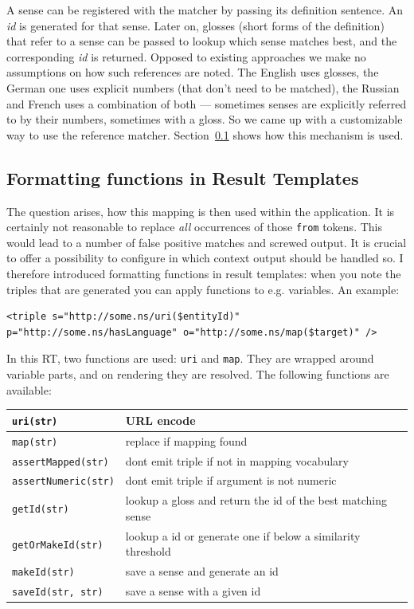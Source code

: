 A sense can be registered with the matcher by passing its definition sentence. 
An \textit{id} is generated for that sense. 
Later on, glosses (short forms of the definition) that refer to a sense can be passed to lookup which sense matches best, and the corresponding \textit{id} is returned. 
Opposed to existing approaches we make no assumptions on how such references are noted. 
The English \wik uses glosses, the German one uses explicit numbers (that don't need to be matched), the Russian and French uses a combination of both --- sometimes senses are explicitly referred to by their numbers, sometimes with a gloss. 
So we came up with a customizable way to use the reference matcher. 
Section~\ref{sec:functions} shows how this mechanism is used.

\subsection{Formatting functions in Result Templates}\label{sec:functions}
The question arises, how this mapping is then used within the application. 
It is certainly not reasonable to replace \textit{all} occurrences of those \texttt{from} tokens. This would lead to a number of false positive matches and screwed output. 
It is crucial to offer a possibility to configure in which context output should be handled so.
I therefore introduced formatting functions in result templates: when you note the triples that are generated you can apply functions to e.g. variables. 
An example:
\begin{lstlisting}[style=XML]
<triple s="http://some.ns/uri($entityId)" p="http://some.ns/hasLanguage" o="http://some.ns/map($target)" />
\end{lstlisting}
In this RT, two functions are used: \texttt{uri} and \texttt{map}. 
They are wrapped around variable parts, and on rendering they are resolved. 
The following functions are available:\\
\begin{table}[h!] 
\centering 
\begin{tabular}{|l|l|}
\hline \texttt{uri(str)} & URL encode \\ 
\hline \texttt{map(str)} & replace if mapping found \\ 
\hline \texttt{assertMapped(str)} & dont emit triple if not in mapping vocabulary \\ 
\hline \texttt{assertNumeric(str)} & dont emit triple if argument is not numeric \\ 
\hline \texttt{getId(str)} & lookup a gloss and return the id of the best matching sense \\ 
\hline \texttt{getOrMakeId(str)} & lookup a id or generate one if below a similarity threshold \\ 
\hline \texttt{makeId(str)} & save a sense and generate an id \\ 
\hline \texttt{saveId(str, str)} & save a sense with a given id \\ 
\hline 
\end{tabular} 
\end{table}
